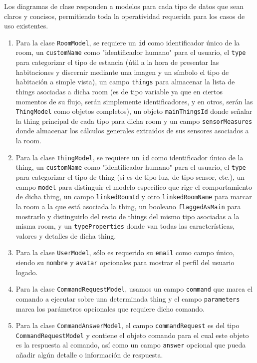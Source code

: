 Los diagramas de clase responden a modelos para cada tipo de datos que sean claros y concisos, permitiendo toda la operatividad requerida para los casos de uso existentes.
\begin{enumerate}

\item Para la clase \verb|RoomModel|, se requiere un \verb|id| como identificador único de la room, un  \verb|customName| como "identificador humano" para el usuario, el \verb|type| para categorizar el tipo de estancia (útil a la hora de presentar las habitaciones y discernir mediante una imagen y un símbolo el tipo de habitación a simple vista), un campo \verb|things| para almacenar la lista de things asociadas a dicha room (es de tipo variable ya que en ciertos momentos de su flujo, serán simplemente identificadores, y en otros, serán las \verb|ThingModel| como objetos completos), un objeto \verb|mainThingsId| donde señalar la thing principal de cada tipo para dicha room y un campo \verb|sensorMeasures| donde almacenar los cálculos generales extraidos de sus sensores asociados a la room.

\item Para la clase \verb|ThingModel|, se requiere un \verb|id| como identificador único de la thing, un  \verb|customName| como "identificador humano" para el usuario, el \verb|type| para categorizar el tipo de thing (si es de tipo luz, de tipo sensor, etc.), un campo \verb|model| para distinguir el modelo específico que rige el comportamiento de dicha thing, un campo \verb|linkedRoomId| y otro \verb|linkedRoomName| para marcar la room a la que está asociada la thing, un booleano \verb|flaggedAsMain| para mostrarlo y distinguirlo del resto de things del mismo tipo asociadas a la misma room, y un \verb|typeProperties| donde van todas las características, valores y detalles de dicha thing.

\item Para la clase \verb|UserModel|, sólo es requerido su \verb|email| como campo único, siendo su \verb|nombre| y \verb|avatar| opcionales para mostrar el perfil del usuario logado.

\item Para la clase \verb|CommandRequestModel|, usamos un campo \verb|command| que marca el comando a ejecutar sobre una determinada thing y el campo \verb|parameters| marca los parámetros opcionales que requiere dicho comando.

\item Para la clase \verb|CommandAnswerModel|, el campo \verb|commandRequest| es del tipo \verb|CommandRequestModel| y contiene el objeto comando para el cual este objeto es la respuesta al comando, así como un campo \verb|answer| opcional que pueda añadir algún detalle o información de respuesta.

\end{enumerate}

